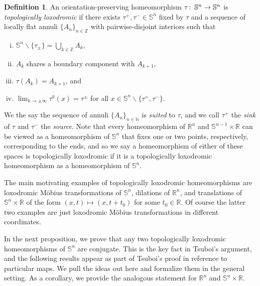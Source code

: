 \documentclass[microtype]{gtpart}
\newcommand{\br}{\mathbb{R}}
\newcommand{\bz}{\mathbb Z}
\newcommand{\bn}{\mathbb N}
\newcommand{\ssm}{\smallsetminus}
\DeclareMathOperator{\Homeo}{Homeo}
\DeclareMathOperator{\fix}{fix}
\renewcommand{\co}{\colon\thinspace}
\theoremstyle{definition}
\newtheorem{Def}[Thm]{Definition}
\numberwithin{equation}{section}
\begin{document}
\begin{Def}
An orientation-preserving homeomorphism \( \tau \co \mathbb S^n \to \mathbb S^n \) is \emph{topologically loxodromic} if there exists \( \tau^+, \tau^- \in \mathbb S^n \) fixed by \( \tau \) and a sequence of  locally flat annuli \( \{ A_n\}_{n\in\bz} \) with pairwise-disjoint interiors such that 
\begin{enumerate}[(i)]
\item \( \mathbb S^n \ssm \{\tau_\pm\} = \bigcup_{k\in\bz} A_k \),
\item \( A_k \) shares a boundary component with \( A_{k+1} \), 
\item \( \tau(A_k) = A_{k+1} \), and
\item \( \lim_{k\to\pm\infty} \tau^k(x) = \tau^\pm \) for all \( x \in \mathbb S^n \ssm \{\tau^+, \tau^-\} \).
\end{enumerate}
We the say the sequence of annuli \( \{A_n\}_{n\in\bn} \) is \emph{suited} to \( \tau \), and we call \( \tau^+ \) the \emph{sink} of \( \tau \) and \( \tau^- \) the \emph{source}. 
Note that every homeomorphism of \( \br^n \) and \( \mathbb S^{n-1} \times \br \) can be viewed as a homeomorphism of \( \mathbb S^n \) that fixes one or two points, respectively, corresponding to the ends, and so we say a homeomorphism of either of these spaces is topologically loxodromic if it is a topologically loxodromic homeomorphism as a homeomorphism of \( \mathbb S^n \). 
\end{Def}

The main motivating examples of topologically loxodromic homeomorphisms are loxodromic M\"obius transformations of \( \mathbb S^n \),  dilations of \( \mathbb R^n \), and translations of \( \mathbb S^n \times \br \) of the form \( (x,t) \mapsto (x, t+t_0) \) for some \( t_0 \in \br \).  
Of course the latter two examples are just loxodromic M\"obius transformations in different coordinates. 


In the next proposition, we prove that any two topologically loxodromic homeomorphisms of \( \mathbb S^n \) are conjugate.  
This is the key fact in Tsuboi's argument, and the following results appear as part of Tsuboi's proof in reference to particular maps.
We pull the ideas out here and formalize them in the general setting. 
As a corollary, we provide the analogous statement for \( \br^n \) and \( \mathbb S^n \times \br \). 
\end{document}
